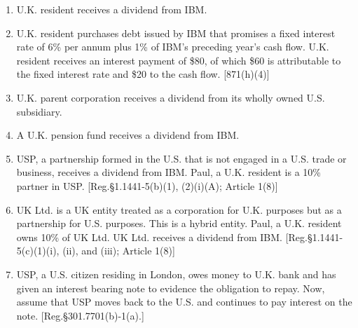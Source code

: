 \begin{select}
\begin{enumerate}
			\item U.K. resident receives a dividend from IBM.
			
			\item U.K. resident purchases debt issued by IBM that promises a fixed interest rate of 6\% per annum plus 1\% of IBM's preceding year's cash flow.  U.K. resident receives an interest payment of \$80, of which \$60 is attributable to the fixed interest rate and \$20 to the cash flow. [871(h)(4)]
			
			\item U.K. parent corporation receives a dividend from its wholly owned U.S. subsidiary.
			
			\item A U.K. pension fund receives a dividend from IBM. 
			
			\item USP, a partnership formed in the U.S. that is not engaged in a U.S. trade or business, receives a dividend from IBM.  Paul, a U.K. resident is a 10\% partner in USP.  [Reg.\@ \S 1.1441-5(b)(1), (2)(i)(A); Article 1(8)]
			
			\item UK Ltd. is a UK entity treated as a corporation for U.K. purposes but as a partnership for U.S. purposes.  This is a hybrid entity.  Paul, a U.K. resident owns 10\% of UK Ltd.  UK Ltd. receives a dividend from IBM.   [Reg.\@ \S 1.1441-5(c)(1)(i), (ii), and (iii); Article 1(8)] 
			
			\item USP, a U.S. citizen residing in London, owes money to U.K. bank and has given an interest bearing note to evidence the obligation to repay.  Now, assume that USP moves back to the U.S. and continues to pay interest on the note.  [Reg.\@ \S 301.7701(b)-1(a).]
			
			

\end{enumerate}
\end{select}
